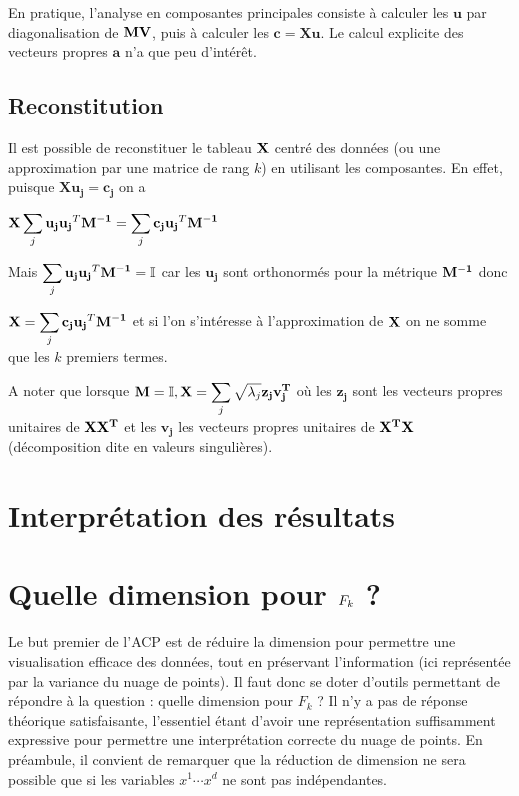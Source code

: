 \documentclass[letterpaper,10pt,english]{jupyterBook}
\begin{document}
\sphinxAtStartPar
En pratique, l’analyse en composantes principales consiste à calculer les \(\mathbf{u}\) par diagonalisation de \({\bf MV}\), puis à calculer les \(\mathbf{c}=\mathbf{Xu}\). Le calcul explicite des vecteurs propres \(\mathbf{a}\) n’a que peu d’intérêt.


\subsection{Reconstitution}
\label{\detokenize{acp:reconstitution}}
\sphinxAtStartPar
Il est possible de reconstituer le tableau \({\bf X}\) centré des données (ou une approximation par une matrice de rang \(k\)) en utilisant les composantes. En effet, puisque \(\mathbf{Xu_j}=\mathbf{c_j}\) on a

\sphinxAtStartPar
\({\bf X}\displaystyle\sum_j \mathbf{u_j}\mathbf{u_j}^T{\bf M^{-1}} = \displaystyle\sum_j\mathbf{c_j}\mathbf{u_j}^T{\bf M^{-1}}\)

\sphinxAtStartPar
Mais \(\displaystyle\sum_j \mathbf{u_j}\mathbf{u_j}^T{\bf M^{-1}}=\mathbb{I}\)  car les \(\mathbf{u_j}\) sont orthonormés pour la métrique \({\bf M^{-1}}\) donc

\sphinxAtStartPar
\({\bf X}=\displaystyle\sum_j\mathbf{c_j}\mathbf{u_j}^T{\bf M^{-1}}\)
et si l’on s’intéresse à l’approximation de \({\bf X}\) on ne somme que les \(k\) premiers termes.

\sphinxAtStartPar
A noter que lorsque \({\bf M}=\mathbb{I}, {\bf X}= \displaystyle\sum_j\sqrt{\lambda_j}\mathbf{z_j}\mathbf{v_j^T}\) où les \(\mathbf{z_j}\) sont les vecteurs propres unitaires de \({\bf XX^T}\) et les \(\mathbf{v_j}\) les vecteurs propres unitaires de \({\bf X^TX}\) (décomposition dite en valeurs singulières).


\section{Interprétation des résultats}
\label{\detokenize{acp:interpretation-des-resultats}}

\section{Quelle dimension pour \protect\(F_k\protect\) ?}
\label{\detokenize{acp:quelle-dimension-pour-f-k}}
\sphinxAtStartPar
Le but premier de l’ACP est de réduire la dimension pour permettre une visualisation efficace des données, tout en préservant l’information (ici représentée par la variance du nuage de points).  Il faut donc se doter d’outils permettant de répondre à la question : quelle dimension pour \(F_k\) ? Il n’y a pas de réponse théorique satisfaisante, l’essentiel étant d’avoir une représentation suffisamment expressive pour permettre une interprétation correcte du nuage de points.
En préambule, il convient de remarquer que la réduction de dimension ne sera possible que si les variables \(x^1\cdots x^d\) ne sont pas indépendantes.
\end{document}
